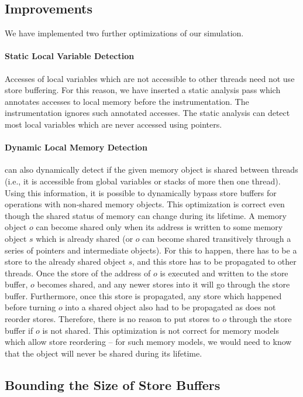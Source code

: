 \subsection{Improvements} \label{sec:opt}

We have implemented two further optimizations of our \xtso simulation.

\paragraph{Static Local Variable Detection}
Accesses of local variables which are not accessible to other threads need not
use store buffering.  For this reason, we have inserted a static analysis pass
which annotates accesses to local memory before the \xtso instrumentation.  The
instrumentation ignores such annotated accesses.  The static analysis can
detect most local variables which are never accessed using pointers.


\paragraph{Dynamic Local Memory Detection}
\divine can also dynamically detect if the given memory object is shared between threads (i.e., it is accessible from global variables or stacks of more then one thread).
Using this information, it is possible to dynamically bypass store buffers for operations with non-shared memory objects.
This optimization is correct even though the shared status of memory can change during its lifetime.
A memory object $o$ can become shared only when its address is written to some memory object $s$ which is already shared (or $o$ can become shared transitively through a series of pointers and intermediate objects).
For this to happen, there has to be a store to the already shared object $s$, and this store has to be propagated to other threads.
Once the store of the address of $o$ is executed and written to the store buffer, $o$ becomes shared, and any newer stores into it will go through the store buffer.
Furthermore, once this store is propagated, any store which happened before turning $o$ into a shared object also had to be propagated as \xtso does not reorder stores.
Therefore, there is no reason to put stores to $o$ through the store buffer if $o$ is not shared.
This optimization is not correct for memory models which allow store reordering -- for such memory models, we would need to know that the object will never be shared during its lifetime.

\subsection{Bounding the Size of Store Buffers}

